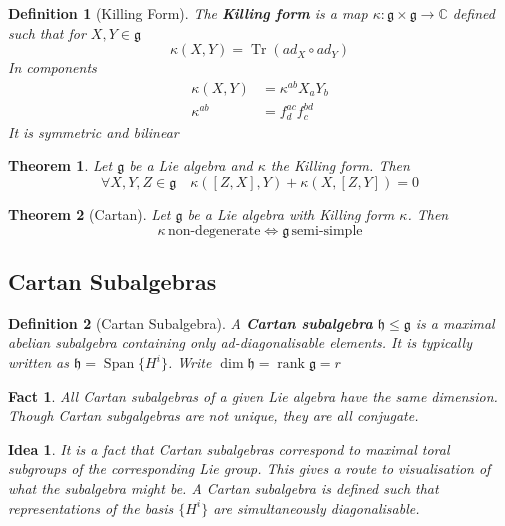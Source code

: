 \documentclass{article}
\newtheorem{theorem}{Theorem}[subsection]
\newtheorem{definition}{Definition}[subsection]
\newtheorem{fact}{Fact}[subsection]
\newtheorem*{idea}{Idea}
\DeclareMathOperator{\spn}{Span}
\DeclareMathOperator{\tr}{Tr}
\DeclareMathOperator{\rank}{rank}
\newcommand{\bam}[1]{\textbf{#1}}
\newcommand{\mf}[1]{\mathfrak{#1}}
\newcommand{\mbb}[1]{\mathbb{#1}}
\newcommand{\comm}[2][]{\left[ #1, #2 \right]}
\begin{document}
\begin{definition}[Killing Form]
The \bam{Killing form} is a map $\kappa:\mf{g}\times\mf{g}\to\mbb{C}$ defined such that for $X,Y\in\mf{g}$
\[
\kappa\left(X,Y\right)=\tr\left(ad_X \circ ad_Y\right)
\]
In components 
\begin{align*}
    \kappa(X,Y) &= \kappa^{ab}X_a Y_b \\
    \kappa^{ab} &= f^{ac}_d f^{bd}_c
\end{align*}
It is symmetric and bilinear 
\end{definition}

\begin{theorem}
Let $\mf{g}$ be a Lie algebra and $\kappa$ the Killing form. Then
\[
\forall X,Y,Z\in\mf{g} \quad \kappa\left(\comm[Z]{X},Y\right)+\kappa\left(X,\comm[Z]{Y}\right)=0
\]
\end{theorem}

\begin{theorem}[Cartan]
Let $\mf{g}$ be a Lie algebra with Killing form $\kappa$. Then 
\[
\kappa \, \text{non-degenerate} \Leftrightarrow \mf{g} \, \text{semi-simple}
\]
\end{theorem}

\subsection{Cartan Subalgebras}

\begin{definition}[Cartan Subalgebra]
A \bam{Cartan subalgebra} $\mf{h}\leq\mf{g}$ is a maximal abelian subalgebra containing only ad-diagonalisable elements. It is typically written as $\mf{h}=\spn\lbrace H^i \rbrace$. Write $\dim{\mf{h}}=\rank{\mf{g}}=r$
\end{definition}

\begin{fact}
All Cartan subalgebras of a given Lie algebra have the same dimension. Though Cartan subgalgebras are not unique, they are all conjugate. 
\end{fact}

\begin{idea}
It is a fact that Cartan subalgebras correspond to maximal toral subgroups of the corresponding Lie group. This gives a route to visualisation of what the subalgebra might be. A Cartan subalgebra is defined such that representations of the basis $\lbrace H^i \rbrace$ are simultaneously diagonalisable. 
\end{idea}
\end{document}
